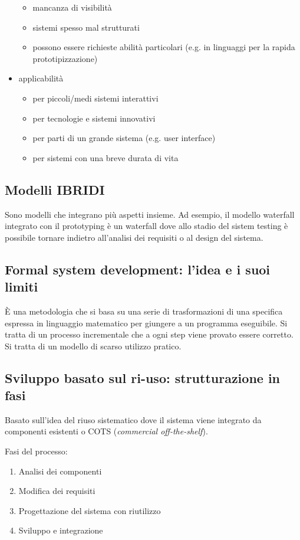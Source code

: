 \begin{itemize}
\begin{itemize}
        \item mancanza di visibilità
        \item sistemi spesso mal strutturati
        \item possono essere richieste abilità particolari (e.g. in linguaggi per la rapida prototipizzazione)
    \end{itemize}
    \item applicabilità
    \begin{itemize}
        \item per piccoli/medi sistemi interattivi
        \item per tecnologie e sistemi innovativi
        \item per parti di un grande sistema (e.g. user interface)
        \item per sistemi con una breve durata di vita
    \end{itemize}
\end{itemize}
\subsection{Modelli IBRIDI}
Sono modelli che integrano più aspetti insieme.  Ad esempio, il modello waterfall integrato con il prototyping è un waterfall dove allo stadio del sistem testing è possibile tornare indietro all'analisi dei requisiti o al design del sistema.
\subsection{Formal system development: l’idea e i suoi limiti}
È una metodologia che si basa su una serie di trasformazioni di una specifica espressa in linguaggio matematico per giungere a un programma eseguibile.  Si tratta di un processo incrementale che a ogni step viene provato essere corretto.  Si tratta di un modello di scarso utilizzo pratico.
\subsection{Sviluppo basato sul ri-uso: strutturazione in fasi}
Basato sull'idea del riuso sistematico dove il sistema viene integrato da componenti esistenti o COTS (\textit{commercial off-the-shelf}).

Fasi del processo:
\begin{enumerate}
    \item Analisi dei componenti
    \item Modifica dei requisiti
    \item Progettazione del sistema con riutilizzo
    \item Sviluppo e integrazione
\end{enumerate}

